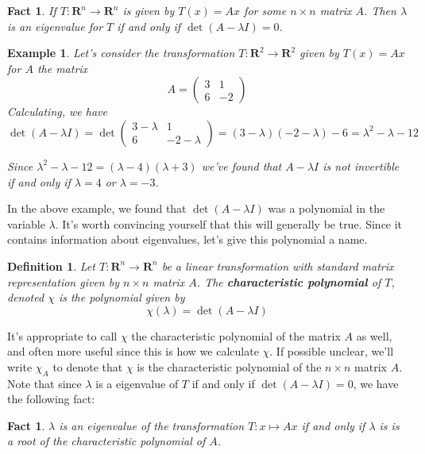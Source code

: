 \documentclass[12pt]{article}
\numberwithin{equation}{subsection}
\numberwithin{figure}{subsection}
\newtheorem{defn}[subsection]{Definition}
\newtheorem{fact}[subsection]{Fact}
\theoremstyle{note}
\newtheorem{example}[subsection]{Example}
\begin{document}
\begin{fact}
	If $T\colon\mathbf{R}^n\to\mathbf{R}^n$ is given by $T(x)=Ax$ for some $n\times n$ matrix $A$. Then $\lambda$ is an eigenvalue for $T$ if and only if $\det(A-\lambda I)=0$.
\end{fact}

\begin{example}\label{ex-eigen}Let's consider the transformation $T\colon\mathbf{R}^2\to\mathbf{R}^2$ given by $T(x)=Ax$ for $A$ the matrix \begin{equation} A=\begin{pmatrix} 3 & 1 \\ 6 & -2\end{pmatrix}\end{equation} 
Calculating, we have \[ \det(A-\lambda I)=\det \begin{pmatrix} 3 -\lambda & 1 \\ 6 & -2-\lambda \end{pmatrix} = (3-\lambda)(-2-\lambda)-6=\lambda^2-\lambda -12\]


Since $\lambda^2-\lambda -12=(\lambda -4)(\lambda+3)$ we've found that $A-\lambda I$ is not invertible if and only if $\lambda=4$ or $\lambda=-3$. 

\end{example}
In the above example, we found that $\det(A-\lambda I)$ was a polynomial in the variable $\lambda$. It's worth convincing yourself that this will generally be true. Since it contains information about eigenvalues, let's give this polynomial a name.

\begin{defn}
	Let $T\colon \mathbf{R}^n\to\mathbf{R}^n$ be a linear transformation with standard matrix representation given by $n\times n$ matrix $A$. The \textbf{characteristic polynomial} of $T$, denoted $\chi$ is the polynomial given by \begin{equation} \chi(\lambda)= \det(A-\lambda I)\end{equation}
\end{defn}

It's appropriate to call $\chi$ the characteristic polynomial of the matrix $A$ as well, and often more useful since this is how we calculate $\chi$. If possible unclear, we'll write $\chi_A$ to denote that $\chi$ is the characteristic polynomial of the $n\times n$ matrix $A$. Note that since $\lambda$ is a eigenvalue of $T$ if and only if $\det(A-\lambda I)=0$, we have the following fact: 

\begin{fact} $\lambda$ is an eigenvalue of the transformation $T\colon x\mapsto Ax$ if and only if $\lambda$ is is a root of the characteristic polynomial of $A$. 
\end{fact}
\end{document}
